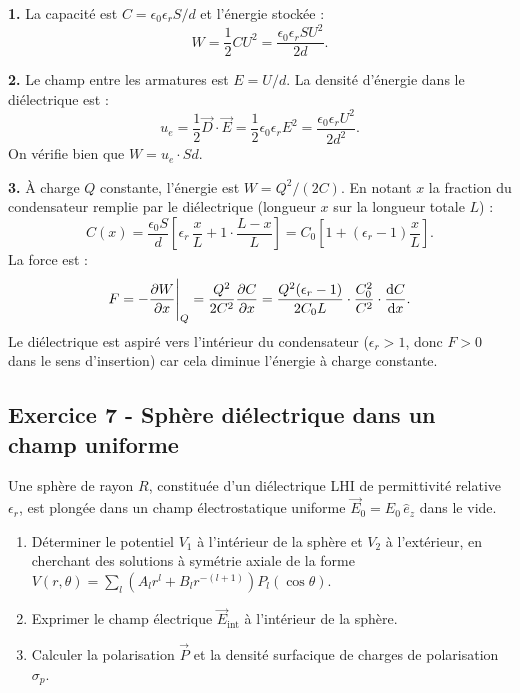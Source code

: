 \documentclass[12pt,a4paper]{article}
\begin{document}
\begin{boitecorrige}

\textbf{1.} La capacité est $C = \epsilon_0\epsilon_r S/d$ et l'énergie stockée :
\[
W = \frac{1}{2}CU^2 = \frac{\epsilon_0\epsilon_r S U^2}{2d}.
\]

\textbf{2.} Le champ entre les armatures est $E = U/d$. La densité d'énergie dans le diélectrique est :
\[
u_e = \frac{1}{2}\vec{D}\cdot\vec{E} = \frac{1}{2}\epsilon_0\epsilon_r E^2 = \frac{\epsilon_0\epsilon_r U^2}{2d^2}.
\]
On vérifie bien que $W = u_e\cdot Sd$.

\textbf{3.} À charge $Q$ constante, l'énergie est $W = Q^2/(2C)$. En notant $x$ la fraction du condensateur remplie par le diélectrique (longueur $x$ sur la longueur totale $L$) :
\[
C(x) = \frac{\epsilon_0 S}{d}\!\left[\epsilon_r\,\frac{x}{L} + 1\cdot\frac{L-x}{L}\right] = C_0\!\left[1 + (\epsilon_r-1)\frac{x}{L}\right].
\]
La force est :
\[
F = -\frac{\partial W}{\partial x}\Bigg|_Q = \frac{Q^2}{2C^2}\frac{\partial C}{\partial x} = \frac{Q^2(\epsilon_r-1)}{2C_0 L}\cdot\frac{C_0^2}{C^2} \cdot \frac{\mathrm{d} C}{\mathrm{d} x}.
\]
Le diélectrique est aspiré vers l'intérieur du condensateur ($\epsilon_r > 1$, donc $F > 0$ dans le sens d'insertion) car cela diminue l'énergie à charge constante.

\end{boitecorrige}

\subsection*{Exercice 7 - Sphère diélectrique dans un champ uniforme \niveau{\difficile}}

\begin{boiteexercice}
Une sphère de rayon $R$, constituée d'un diélectrique LHI de permittivité relative $\epsilon_r$, est plongée dans un champ électrostatique uniforme $\vec{E}_0 = E_0\,\hat{e}_z$ dans le vide.
\begin{enumerate}
  \item Déterminer le potentiel $V_1$ à l'intérieur de la sphère et $V_2$ à l'extérieur, en cherchant des solutions à symétrie axiale de la forme $V(r,\theta) = \sum_l (A_l r^l + B_l r^{-(l+1)})P_l(\cos\theta)$.
  \item Exprimer le champ électrique $\vec{E}_\text{int}$ à l'intérieur de la sphère.
  \item Calculer la polarisation $\vec{P}$ et la densité surfacique de charges de polarisation $\sigma_p$.
\end{enumerate}
\end{boiteexercice}
\end{document}
